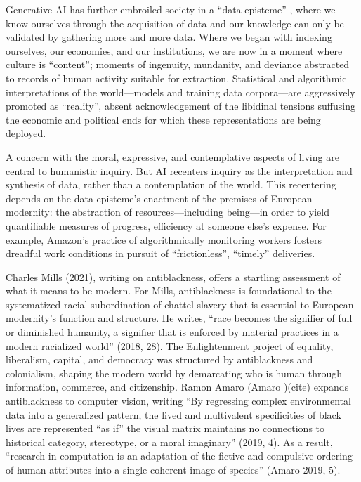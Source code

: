 Generative AI has further embroiled society in a “data episteme'' \cite{Koopman2019-ef}, where we know ourselves through the acquisition of data and our knowledge can only be validated by gathering more and more data.  Where we began with indexing ourselves, our economies, and our institutions, we are now in a moment where culture is ``content''; moments of ingenuity, mundanity, and deviance abstracted to records of human activity suitable for extraction.  Statistical and algorithmic interpretations of the world---models and training data corpora---are aggressively promoted as ``reality'', absent acknowledgement of the libidinal tensions suffusing the economic and political ends for which these representations are being deployed.

A concern with the moral, expressive, and contemplative aspects of living \cite{mesthene_1969} are central to humanistic inquiry.  But AI recenters inquiry as the interpretation and synthesis of data, rather than a contemplation of the world. This recentering depends on the data episteme’s enactment of the premises of European modernity: the abstraction of resources---including being---in order to yield quantifiable measures of progress, efficiency at someone else’s expense.  For example, Amazon’s  practice of algorithmically monitoring workers fosters dreadful work conditions in pursuit of ``frictionless'', ``timely'' deliveries.

Charles Mills (2021), writing on antiblackness, offers a startling assessment of what it means to be modern. For Mills, antiblackness is foundational to the systematized racial subordination of chattel slavery that is essential to European modernity’s function and structure.  He writes, ``race becomes the signifier of full or diminished humanity, a signifier that is enforced by material practices in a modern racialized world'' (2018, 28).  The Enlightenment project of equality, liberalism, capital, and democracy was structured by antiblackness and colonialism, shaping the modern world by demarcating who is human through information, commerce, and citizenship.  Ramon Amaro (Amaro )(cite) expands antiblackness to computer vision, writing ``By regressing complex environmental data into a generalized pattern, the lived and multivalent specificities of black lives are represented ``as if'' the visual matrix maintains no connections to historical category, stereotype, or a moral imaginary'' (2019, 4). As a result, ``research in computation is an adaptation of the fictive and compulsive ordering of human attributes into a single coherent image of species'' (Amaro 2019, 5).  

